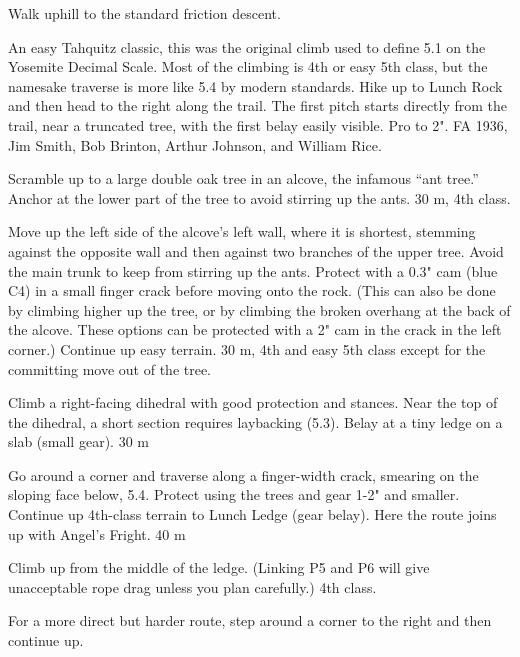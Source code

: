 \documentclass{tahquitz}
\begin{document}
Walk uphill to the standard friction descent.




An easy Tahquitz classic, this was the original climb used to define
5.1 on the Yosemite Decimal Scale. Most of the
climbing is 4th or easy 5th class, but the namesake traverse is more
like 5.4 by modern standards. Hike up to Lunch Rock and then head to the right along the
trail. The first pitch starts directly from the trail, near a 
truncated tree, with the first belay easily visible. Pro to 2". FA
1936, Jim Smith, Bob Brinton, Arthur Johnson, and William Rice.

 Scramble up to a large double oak tree in an alcove, the infamous
``ant tree.'' Anchor at the lower part of the tree to avoid stirring up
the ants. 30 m, 4th class.

 Move up the left side of the alcove's left wall, where it is
shortest, stemming against the opposite wall and then against two  branches
of the upper tree. Avoid the main trunk to keep from stirring up the ants.
Protect with a 0.3" cam (blue C4) in a small
finger crack before moving onto the rock. (This can also be done by
climbing higher up the tree, or by climbing the broken overhang at
the back of the alcove. These options can be protected with a 2" cam
in the crack in the left corner.) Continue up easy terrain. 30 m, 4th and easy 5th class
except for the committing move out of the tree.

 Climb a right-facing dihedral with good protection and
stances. Near the top of the dihedral, a short section requires laybacking (5.3).
Belay at a tiny ledge on a slab (small gear). 30 m

 Go around a corner and traverse along a finger-width crack,
smearing on the sloping face below, 5.4. Protect using the trees and
gear 1-2" and smaller. Continue up 4th-class terrain to Lunch Ledge (gear
belay). Here the route joins up with Angel's Fright. 40 m


 Climb up from the middle of the ledge. (Linking P5 and P6 will
give unacceptable rope drag unless you plan carefully.) 4th class.

 For a more direct but harder route, step around a corner
to the right and then continue up.
\end{document}
